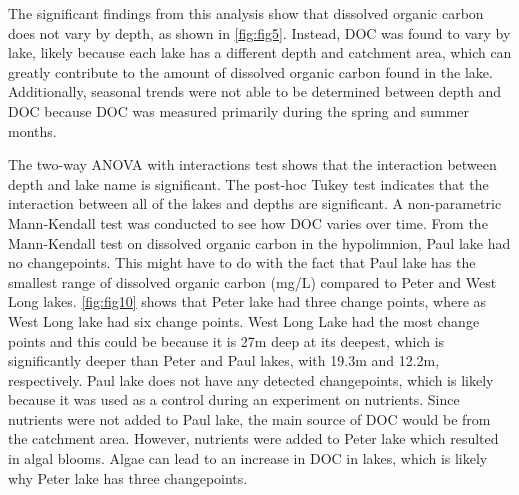 \documentclass[12pt,]{article}
\begin{document}
The significant findings from this analysis show that dissolved organic
carbon does not vary by depth, as shown in \autoref{fig:fig5}. Instead,
DOC was found to vary by lake, likely because each lake has a different
depth and catchment area, which can greatly contribute to the amount of
dissolved organic carbon found in the lake. Additionally, seasonal
trends were not able to be determined between depth and DOC because DOC
was measured primarily during the spring and summer months.

The two-way ANOVA with interactions test shows that the interaction
between depth and lake name is significant. The post-hoc Tukey test
indicates that the interaction between all of the lakes and depths are
significant. A non-parametric Mann-Kendall test was conducted to see how
DOC varies over time. From the Mann-Kendall test on dissolved organic
carbon in the hypolimnion, Paul lake had no changepoints. This might
have to do with the fact that Paul lake has the smallest range of
dissolved organic carbon (mg/L) compared to Peter and West Long lakes.
\autoref{fig:fig10} shows that Peter lake had three change points, where
as West Long lake had six change points. West Long Lake had the most
change points and this could be because it is 27m deep at its deepest,
which is significantly deeper than Peter and Paul lakes, with 19.3m and
12.2m, respectively. Paul lake does not have any detected changepoints,
which is likely because it was used as a control during an experiment on
nutrients. Since nutrients were not added to Paul lake, the main source
of DOC would be from the catchment area. However, nutrients were added
to Peter lake which resulted in algal blooms. Algae can lead to an
increase in DOC in lakes, which is likely why Peter lake has three
changepoints.
\end{document}

